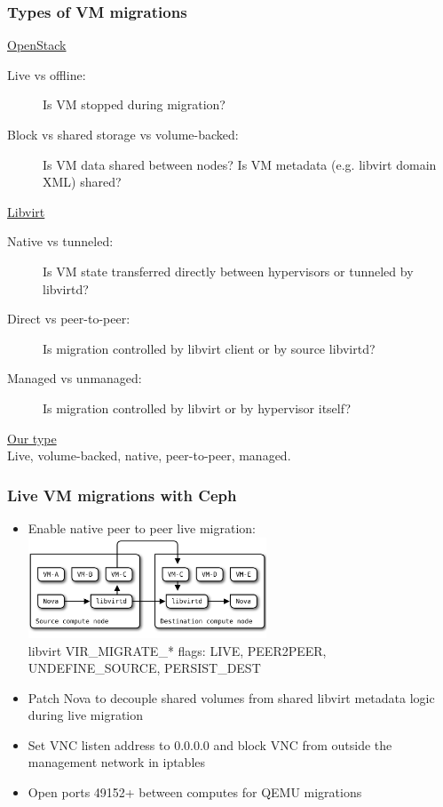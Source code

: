 \documentclass[hyperref=unicode,utf8,xcolor=pst]{beamer}
\begin{document}
\begin{frame}
	\frametitle{Types of VM migrations}
	\underline{OpenStack}
	\begin{description}
		\item [Live vs offline:] Is VM stopped during migration?
		\item [Block vs shared storage vs volume-backed:] Is VM
			data shared between nodes? Is VM metadata
			(e.g. libvirt domain XML) shared?
	\end{description}

	\underline{Libvirt}
	\begin{description}
		\item [Native vs tunneled:] Is VM state transferred
			directly between hypervisors or tunneled by
			libvirtd?
		\item [Direct vs peer-to-peer:] Is migration controlled
			by libvirt client or by source libvirtd?
		\item [Managed vs unmanaged:] Is migration controlled by
			libvirt or by hypervisor itself?
	\end{description}

	\underline{Our type}\\
	\vspace{1ex}
	Live, volume-backed, native, peer-to-peer, managed.
\end{frame}

\begin{frame}
	\frametitle{Live VM migrations with Ceph}
	\begin{itemize}
		\item Enable native peer to peer live migration:\\
			\includegraphics[height=3cm]{libvirt-p2p-migration}\\
			libvirt VIR\_MIGRATE\_* flags: LIVE, PEER2PEER,
			UNDEFINE\_SOURCE, PERSIST\_DEST
		\item Patch Nova to decouple shared volumes from shared
			libvirt metadata logic during live migration
		\item Set VNC listen address to 0.0.0.0 and block VNC
			from outside the management network in iptables
		\item Open ports 49152+ between computes for QEMU
			migrations
	\end{itemize}
\end{frame}
\end{document}
